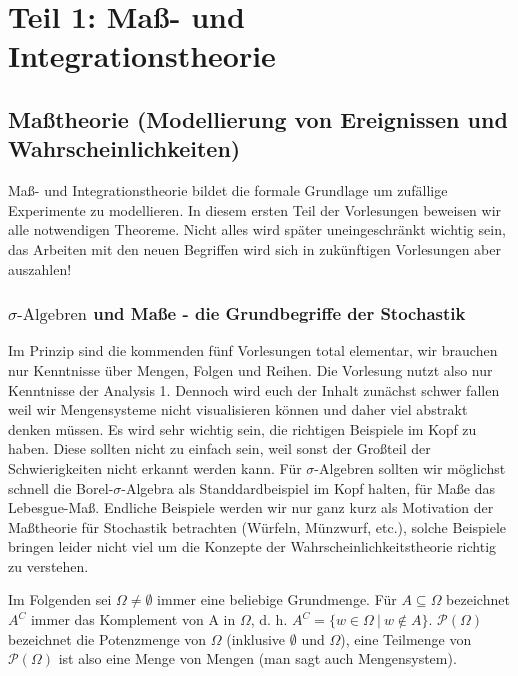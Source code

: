 
	\part*{Teil 1: Maß- und Integrationstheorie}


\chapter{Maßtheorie (Modellierung von Ereignissen und Wahrscheinlichkeiten)}
	\marginpar{\textcolor{red}{Vorlesung 1}}
Ma\ss - und Integrationstheorie bildet die formale Grundlage um zuf\"allige Experimente zu modellieren. In diesem ersten Teil der Vorlesungen beweisen wir alle notwendigen Theoreme. Nicht alles wird sp\"ater uneingeschr\"ankt wichtig sein, das Arbeiten mit den neuen Begriffen wird sich in zuk\"unftigen Vorlesungen aber auszahlen!


\section{$\sigma\text{-Algebren}$ und Maße - die Grundbegriffe der Stochastik}\label{sigmaalgebra}
Im Prinzip sind die kommenden f\"unf Vorlesungen total elementar, wir brauchen nur Kenntnisse \"uber Mengen, Folgen und Reihen. Die Vorlesung nutzt also nur Kenntnisse der Analysis 1. Dennoch wird euch der Inhalt zun\"achst schwer fallen weil wir Mengensysteme nicht visualisieren k\"onnen und daher viel abstrakt denken m\"ussen. Es wird sehr wichtig sein, die richtigen Beispiele im Kopf zu haben. Diese sollten nicht zu einfach sein, weil sonst der Gro\ss teil der Schwierigkeiten nicht erkannt werden kann. F\"ur $\sigma$-Algebren sollten wir m\"oglichst schnell die Borel-$\sigma$-Algebra als Standdardbeispiel im Kopf halten, f\"ur Ma\ss e das Lebesgue-Ma\ss. Endliche Beispiele werden wir nur ganz kurz als Motivation der Ma\ss theorie f\"ur Stochastik betrachten (W\"urfeln, M\"unzwurf, etc.), solche Beispiele bringen leider nicht viel um die Konzepte der Wahrscheinlichkeitstheorie richtig zu verstehen.\smallskip

Im Folgenden sei $\Omega \neq \emptyset $ immer eine beliebige Grundmenge. Für $A \subseteq \Omega$ bezeichnet $A^C$ immer das Komplement von A in $\Omega$, d. h. $A^C = \{ w \in \Omega \: | \: w \notin A \}$. $\mathcal{P}(\Omega)$ bezeichnet die Potenzmenge von $\Omega$ (inklusive $\emptyset$ und $\Omega$), eine Teilmenge von $\mathcal{P}(\Omega)$ ist also eine Menge von Mengen (man sagt auch Mengensystem).


